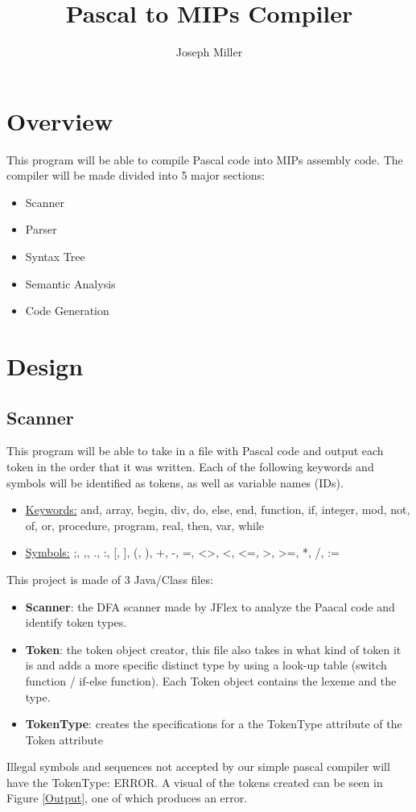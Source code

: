 \documentclass[english]{article}
\begin{document}
\title{Pascal to MIPs Compiler}
\author{Joseph Miller}
\maketitle


\section{Overview}

This program will be able to compile Pascal code into MIPs assembly code.  The compiler will be made divided into 5 major sections:

\begin{itemize}
\item
Scanner
\item
Parser
\item
Syntax Tree
\item
Semantic Analysis
\item
Code Generation
\end{itemize}


\par\addvspace{1cm}%
\section{Design}

\subsection{Scanner}

This program will be able to take in a file with Pascal code and output each token in the order that it was written. Each of the following keywords and symbols will be identified as tokens, as well as variable names (IDs).


\begin{itemize}
\item
\underline{Keywords:} and, array, begin, div, do, else, end, function, if, integer, mod, not, of, or, procedure, program, real, then, var, while
\item
\underline{Symbols:} ;, ,, ., :, [, ], (, ), +, -, =, \textless\textgreater, \textless, \textless=, \textgreater, \textgreater=, *, /, :=
\end{itemize}
This project is made of 3 Java/Class files:
\begin{itemize}

\item
\textbf{Scanner}: the DFA scanner made by JFlex to analyze the Paacal code and identify token types.
\item
\textbf{Token}: the token object creator, this file also takes in what kind of token it is and adds a more specific distinct type by using a look-up table (switch function / if-else function). Each Token object contains the lexeme and the type.
\item
\textbf{TokenType}: creates the specifications for a the TokenType attribute of the Token attribute
\end{itemize}
Illegal symbols and sequences not accepted by our simple pascal compiler will have the TokenType: ERROR. A visual of the tokens created can be seen in Figure \ref{Output}, one of which produces an error.
\end{document}

